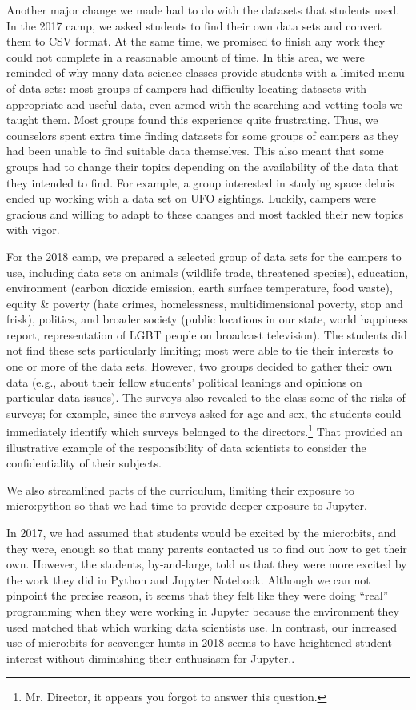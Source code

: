 Another major change we made had to do with the datasets that
students used.  In the 2017 camp, we asked students to find their
own data sets and convert them to CSV format.  At the same time,
we promised to finish any work they could not complete in a reasonable
amount of time.  In this area, we were reminded of why many data
science classes provide students with a limited menu of data sets:
most groups of campers had difficulty locating datasets with
appropriate and useful data, even armed with the searching and
vetting tools we taught them.  Most groups found this experience
quite frustrating.  Thus, we counselors spent extra time finding
datasets for some groups of campers as they had been unable to find
suitable data themselves.  This also meant that some groups had to
change their topics depending on the availability of the data that
they intended to find.  For example, a group interested in studying
space debris ended up working with a data set on UFO sightings.
Luckily, campers were gracious and willing to adapt to these changes
and most tackled their new topics with vigor.

For the 2018 camp, we prepared a selected group of data sets for
the campers to use, including data sets on animals (wildlife trade,
threatened species), education, environment (carbon dioxide emission,
earth surface temperature, food waste), equity \& poverty (hate crimes,
homelessness, multidimensional poverty, stop and frisk), politics,
and broader society (public locations in our state, world happiness
report, representation of LGBT people on broadcast television).
The students did not find these sets particularly limiting; most
were able to tie their interests to one or more of the data sets.
However, two groups decided to gather their own data (e.g., about
their fellow students' political leanings and opinions on particular
data issues).  The surveys also revealed to the class some of the
risks of surveys; for example, since the surveys asked for age and
sex, the students could immediately identify which surveys belonged
to the directors.\footnote{Mr. Director, it appears you forgot to
answer this question.}  That provided an illustrative example of
the responsibility of data scientists to consider the confidentiality
of their subjects.

We also streamlined parts of the curriculum, limiting their exposure
to micro:python so that we had time to provide deeper exposure to Jupyter.

In 2017, we had assumed that students would be excited by the
micro:bits, and they were, enough so that many parents contacted
us to find out how to get their own.  However, the students,
by-and-large, told us that they were more excited by the work they
did in Python and Jupyter Notebook.  Although we can not pinpoint
the precise reason, it seems that they felt like they were doing
``real'' programming when they were working in Jupyter because the
environment they used matched that which working data scientists
use.  In contrast, our increased use of micro:bits for scavenger
hunts in 2018 seems to have heightened student interest without
diminishing their enthusiasm for Jupyter..

